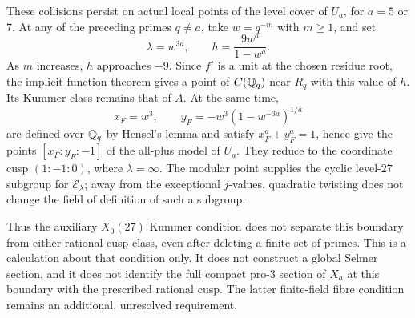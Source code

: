 \begin{remark}
\label{rem:auxiliary-level27-local-fermat}
These collisions persist on actual local points of the level cover of
\(U_a\), for \(a=5\) or \(7\).
At any of the preceding primes \(q\ne a\), take \(w=q^{-m}\) with
\(m\ge1\), and set
\[
 \lambda=w^{3a},\qquad
 h=\frac{9w^a}{1-w^a}.
\]
As \(m\) increases, \(h\) approaches \(-9\).
Since \(f'\) is a unit at the chosen residue root, the implicit
function theorem gives a point of \(C(\mathbb Q_q)\) near \(R_q\) with
this value of \(h\). Its Kummer class remains that of \(A\).
At the same time,
\[
 x_F=w^3,\qquad
 y_F=-w^3(1-w^{-3a})^{1/a}
\]
are defined over \(\mathbb Q_q\) by Hensel's lemma and satisfy
\(x_F^a+y_F^a=1\), hence give the points
\([x_F:y_F:-1]\) of the all-plus model of \(U_a\).
They reduce to the coordinate cusp \((1:-1:0)\), where
\(\lambda=\infty\).
The modular point supplies the cyclic level-\(27\) subgroup for
\(\mathcal E_\lambda\); away from the exceptional \(j\)-values,
quadratic twisting does not change the field of definition of such
a subgroup.

Thus the auxiliary \(X_0(27)\) Kummer condition does not separate
this boundary from either rational cusp class, even after deleting
a finite set of primes. This is a calculation about that condition
only. It does not construct a global Selmer section, and it does
not identify the full compact pro-$3$ section of \(X_a\) at this
boundary with the prescribed rational cusp. The latter finite-field
fibre condition remains an additional, unresolved requirement.
\end{remark}

